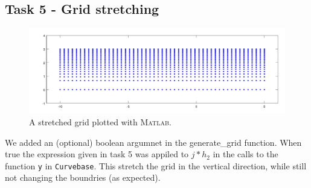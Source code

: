 \documentclass[paper=a4, fontsize=12pt]{article} %
\begin{document}
\subsection*{Task 5 - Grid stretching}


\begin{figure}[H]
  \centering
  \includegraphics[width=\textwidth]{task5.pdf}
  \caption{A stretched grid plotted with \textsc{Matlab.}\label{fig:stretched}}
\end{figure}

We added an (optional) boolean argumnet in the generate_grid function. When true the expression given in task 5 was appiled to $j*h_2$ in the calls to the function \texttt{y} in \texttt{Curvebase}. This stretch the grid in the vertical direction, while still not changing the boundries (as expected).  
\end{document}
